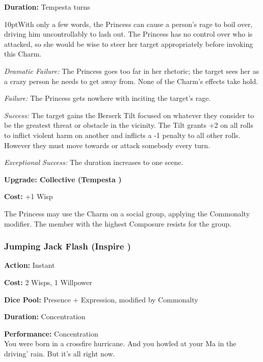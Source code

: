 \noindent \textbf{Duration:} Tempesta turns \\

\begin{myindentpar}{10pt}\noindent With only a few words, the Princess can cause a person's rage to boil over, driving him uncontrollably to lash out. The Princess has no control over who is attacked, so she would be wise to steer her target appropriately before invoking this Charm.

    \emph{Dramatic Failure:} The Princess goes too far in her rhetoric; the target sees her as a crazy person he needs to get away from. None of the Charm's effects take hold.

    \emph{Failure:} The Princess gets nowhere with inciting the target's rage.

    \emph{Success:} The target gains the Berserk Tilt focused on whatever they consider to be the greatest threat or obstacle in the vicinity. The Tilt grants +2 on all rolls to inflict violent harm on another and inflicts a -1 penalty to all other rolls. However they must move towards or attack somebody every turn.

    \emph{Exceptional Success:} The duration increases to one scene. 

\textbf{Upgrade: Collective (Tempesta \textbullet\textbullet\textbullet\textbullet)}

\noindent \textbf{Cost:} +1 Wisp

The Princess may use the Charm on a social group, applying the Commonalty modifier. The member with the highest Composure resists for the group.\end{myindentpar}

\subsubsection*{Jumping Jack Flash (Inspire \textbullet\textbullet\textbullet\textbullet\textbullet)}

\noindent \textbf{Action:} Instant 

\noindent \textbf{Cost:} 2 Wisps, 1 Willpower

\noindent \textbf{Dice Pool:} Presence + Expression, modified by Commonalty

\noindent \textbf{Duration:} Concentration 

\noindent \textbf{Performance:} Concentration \\ 

\noindent You were born in a crossfire hurricane. And you howled at your Ma in the driving' rain. But it's all right now.

